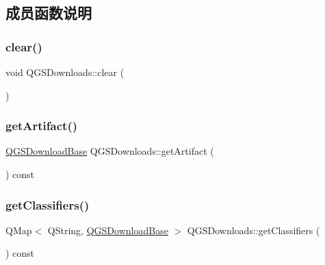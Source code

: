 \subsection{成员函数说明}
\mbox{\label{class_q_g_s_downloads_a0e297c3394413af1514020c24136d8fe}} 
\subsubsection{\texorpdfstring{clear()}{clear()}}
{\footnotesize\ttfamily void Q\+G\+S\+Downloads\+::clear (\begin{DoxyParamCaption}{ }\end{DoxyParamCaption})}

\mbox{\label{class_q_g_s_downloads_acdfd11b32b12c162be5900c5d6f9457a}} 
\subsubsection{\texorpdfstring{get\+Artifact()}{getArtifact()}}
{\footnotesize\ttfamily \mbox{\hyperlink{class_q_g_s_download_base}{Q\+G\+S\+Download\+Base}} Q\+G\+S\+Downloads\+::get\+Artifact (\begin{DoxyParamCaption}{ }\end{DoxyParamCaption}) const}

\mbox{\label{class_q_g_s_downloads_a734a2d34db6c5522ad3b801daf04e271}} 
\subsubsection{\texorpdfstring{get\+Classifiers()}{getClassifiers()}}
{\footnotesize\ttfamily Q\+Map$<$ Q\+String, \mbox{\hyperlink{class_q_g_s_download_base}{Q\+G\+S\+Download\+Base}} $>$ Q\+G\+S\+Downloads\+::get\+Classifiers (\begin{DoxyParamCaption}{ }\end{DoxyParamCaption}) const}

